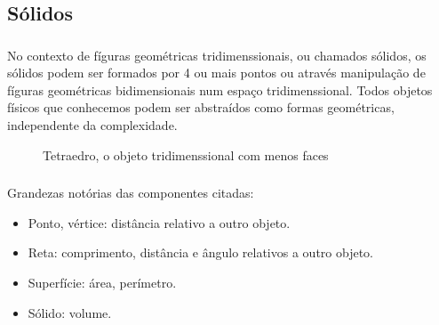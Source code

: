\documentclass{beamer}
\begin{document}
\subsection{Sólidos}
\begin{frame}\frametitle{\subsecname}
    No contexto de fíguras geométricas tridimenssionais, ou chamados sólidos, os sólidos podem ser formados por 4 ou
    mais pontos ou através manipulação de fíguras geométricas bidimensionais num espaço tridimenssional.
    Todos objetos físicos que conhecemos podem ser abstraídos como formas geométricas, independente da complexidade.

    \begin{figure}[H]
        \centering
        \caption{Tetraedro, o objeto tridimenssional com menos faces}
    \end{figure}
\end{frame}

\begin{frame}\frametitle{\subsecname}
    Grandezas notórias das componentes citadas:
    \begin{itemize}
        \setlength\itemsep{1.15pt}
        \item Ponto, vértice: distância relativo a outro objeto.
        \item Reta: comprimento, distância e ângulo relativos a outro objeto.
        \item Superfície: área, perímetro.
        \item Sólido: volume.
    \end{itemize}
\end{frame}
\end{document}
